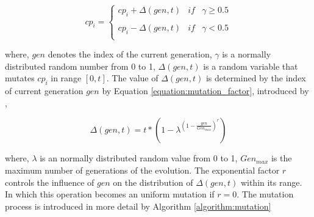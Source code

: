 \begin{equation}
cp_{i} = \left\{
\begin{matrix}
cp_{i} + \Delta(gen, t)   & if & \gamma \geq  0.5\\
\\
cp_{i} - \Delta(gen, t)   & if& \gamma  <  0.5\\
\end{matrix}\right.
\label{equation:mutation}
\end{equation}

where, $gen$ denotes the index of the current generation,  $\gamma$ is a normally distributed random number from 0 to 1, $\Delta(gen, t)$ is a random variable that mutates $cp_{i}$ in range $[0, t]$. The value of $\Delta(gen, t)$ is determined by the index of current generation $gen$ by Equation \ref{equation:mutation_factor}, introduced by \cite{michalewicz1996genetic},

\begin{equation}
\Delta(gen, t) = t * \left ( 1 - \lambda^{\left (1 - \frac{gen}{Gen_{max}}\right )^{r}} \right ) 
\label{equation:mutation_factor}
\end{equation}

where, $\lambda$ is an normally distributed random value from 0 to 1, $Gen_{max}$ is the maximum number of generations of the evolution. The exponential factor $r$ controls the influence of $gen$ on the distribution of $\Delta(gen, t)$ within its range. In which this operation becomes an uniform mutation if $r = 0$. The mutation process is introduced in more detail by Algorithm \ref{algorithm:mutation}


